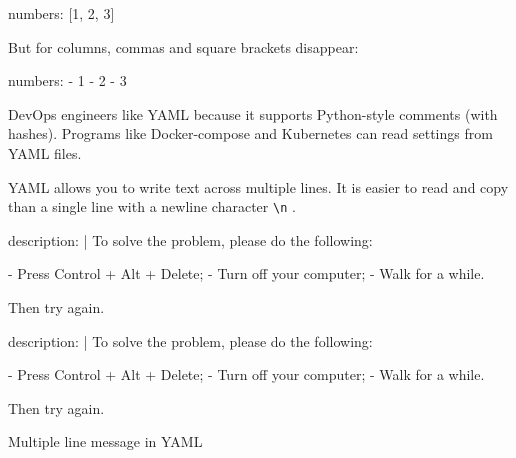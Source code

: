 
\begin{english}
  \begin{yaml}
numbers: [1, 2, 3]
  \end{yaml}
\end{english}

\noindent
But for columns, commas and square brackets disappear:

\begin{english}
  \begin{yaml}
numbers:
  - 1
  - 2
  - 3
  \end{yaml}
\end{english}

DevOps engineers like YAML because it supports Python-style comments (with hashes). Programs like Docker-compose and Kubernetes can read settings from YAML files.

YAML allows you to write text across multiple lines. It is easier to read and copy than a single line with a newline character \verb|\n| .

\begin{listing}[ht!]

\ifx\DEVICETYPE\MOBILE

\begin{english}
  \begin{yaml}
description: |
  To solve the problem,
  please do the following:

  - Press Control + Alt + Delete;
  - Turn off your computer;
  - Walk for a while.

  Then try again.
  \end{yaml}
\end{english}

\else

\begin{english}
  \begin{yaml}
description: |
  To solve the problem, please do the following:

  - Press Control + Alt + Delete;
  - Turn off your computer;
  - Walk for a while.

  Then try again.
  \end{yaml}
\end{english}

\fi

\caption{ Multiple line message in YAML}
\label{fig:yaml-multi-line}

\end{listing}

